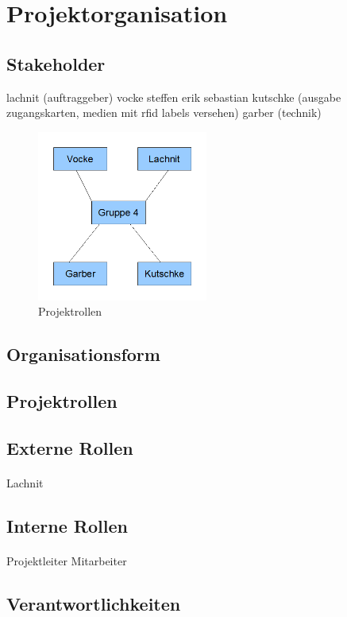 \section{Projektorganisation}

\subsection{Stakeholder}

lachnit (auftraggeber)
vocke
steffen
erik
sebastian
kutschke (ausgabe zugangskarten, medien mit rfid labels versehen)
garber (technik)

\begin{figure} [h]
\includegraphics[width=0.50\textwidth]{abbildungen/projektrollen.png}
\caption{Projektrollen}
\label{fig:Projektrollen}
\end{figure}

\subsection{Organisationsform}
\subsection{Projektrollen}
\subsection{Externe Rollen}

\paragraph*{}
Lachnit

\subsection{Interne Rollen}

\paragraph*{}
Projektleiter
Mitarbeiter

\subsection{Verantwortlichkeiten}